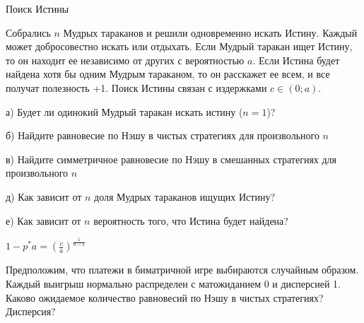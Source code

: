 \begin{problem}
 Поиск Истины \par
Собрались $n$ Мудрых тараканов и решили одновременно искать Истину. Каждый может добросовестно искать или отдыхать. Если Мудрый таракан ищет Истину, то он находит ее независимо от других с вероятностью $a$. Если Истина будет найдена хотя бы одним Мудрым тараканом, то он расскажет ее всем, и все получат полезность +1. Поиск Истины связан с издержками $c\in(0;a)$. \par
а) Будет ли одинокий Мудрый таракан искать истину ($n=1$)? \par
б) Найдите равновесие по Нэшу в чистых стратегиях для произвольного $n$ \par
в) Найдите симметричное равновесие по Нэшу в смешанных стратегиях для произвольного $n$ \par
д) Как зависит от $n$ доля Мудрых тараканов ищущих Истину? \par
е) Как зависит от $n$ вероятность того, что Истина будет найдена?



\begin{sol}

$1-p^{*}a=\left(\frac{c}{a}\right)^{\frac{1}{n-1}}$
\end{sol}
\end{problem}



\begin{problem}
 Предположим, что платежи в биматричной игре выбираются случайным
образом. Каждый выигрыш нормально распределен с матожиданием 0 и
дисперсией 1. Каково ожидаемое количество равновесий по Нэшу в
чистых стратегиях? Дисперсия?



\begin{sol}

\end{sol}
\end{problem}




